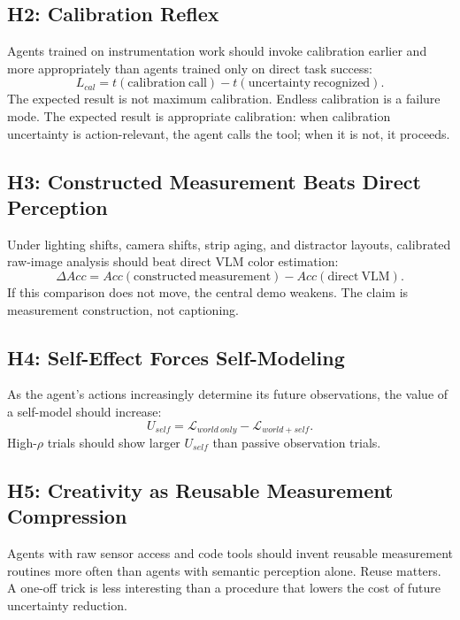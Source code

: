 \documentclass[11pt]{article}
\begin{document}
\subsection{H2: Calibration Reflex}

Agents trained on instrumentation work should invoke calibration earlier and more appropriately than agents trained only on direct task success:
\begin{equation}
  L_{cal}=t(\mathrm{calibration\ call})-t(\mathrm{uncertainty\ recognized}).
\end{equation}
The expected result is not maximum calibration. Endless calibration is a failure mode. The expected result is appropriate calibration: when calibration uncertainty is action-relevant, the agent calls the tool; when it is not, it proceeds.

\subsection{H3: Constructed Measurement Beats Direct Perception}

Under lighting shifts, camera shifts, strip aging, and distractor layouts, calibrated raw-image analysis should beat direct VLM color estimation:
\begin{equation}
  \Delta Acc = Acc(\mathrm{constructed\ measurement})-Acc(\mathrm{direct\ VLM}).
\end{equation}
If this comparison does not move, the central demo weakens. The claim is measurement construction, not captioning.

\subsection{H4: Self-Effect Forces Self-Modeling}

As the agent's actions increasingly determine its future observations, the value of a self-model should increase:
\begin{equation}
  U_{self}=\mathcal{L}_{world\ only}-\mathcal{L}_{world+self}.
\end{equation}
High-$\rho$ trials should show larger $U_{self}$ than passive observation trials.

\subsection{H5: Creativity as Reusable Measurement Compression}

Agents with raw sensor access and code tools should invent reusable measurement routines more often than agents with semantic perception alone. Reuse matters. A one-off trick is less interesting than a procedure that lowers the cost of future uncertainty reduction.
\end{document}

